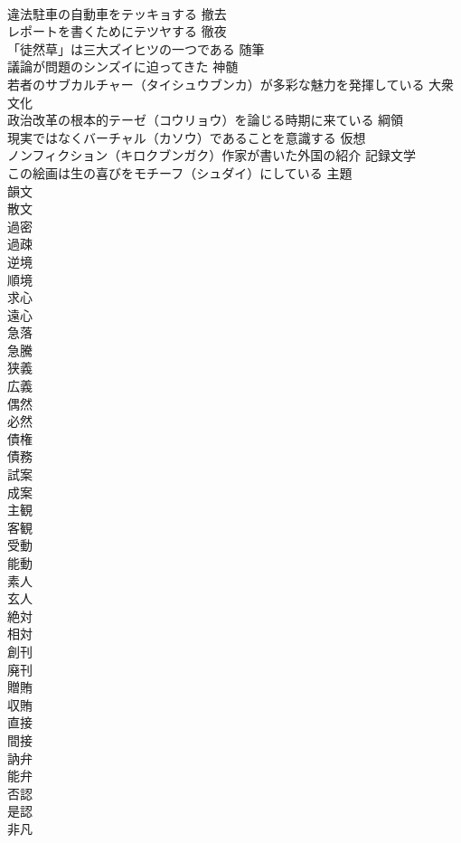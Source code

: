 \documentclass[8pt]{extreport}
\begin{document}
\begin{CJK}{UTF8}{min}
\\	違法駐車の自動車をテッキョする	撤去
\\	レポートを書くためにテツヤする	徹夜
\\	「徒然草」は三大ズイヒツの一つである	随筆
\\	議論が問題のシンズイに迫ってきた	神髄
\\	若者のサブカルチャー（タイシュウブンカ）が多彩な魅力を発揮している	大衆文化
\\	政治改革の根本的テーゼ（コウリョウ）を論じる時期に来ている	綱領
\\	現実ではなくバーチャル（カソウ）であることを意識する	仮想
\\	ノンフィクション（キロクブンガク）作家が書いた外国の紹介	記録文学
\\	この絵画は生の喜びをモチーフ（シュダイ）にしている	主題
\\	韻文
\\	散文
\\	過密
\\	過疎
\\	逆境
\\	順境
\\	求心
\\	遠心
\\	急落
\\	急騰
\\	狭義
\\	広義
\\	偶然
\\	必然
\\	債権
\\	債務
\\	試案
\\	成案
\\	主観
\\	客観
\\	受動
\\	能動
\\	素人
\\	玄人
\\	絶対
\\	相対
\\	創刊
\\	廃刊
\\	贈賄
\\	収賄
\\	直接
\\	間接
\\	訥弁
\\	能弁
\\	否認
\\	是認
\\	非凡

\end{CJK}
\end{document}
